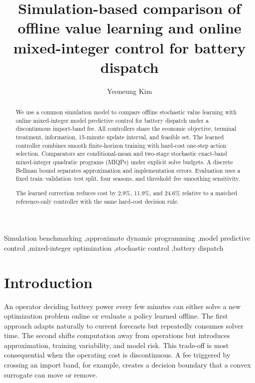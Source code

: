 \documentclass[preprint,11pt]{elsarticle}
\theoremstyle{plain}
\theoremstyle{remark}
\begin{document}
\begin{frontmatter}

\title{Simulation-based comparison of offline value learning and online
mixed-integer control for battery dispatch}

\author[aff1]{Yeoneung Kim}

\begin{abstract}
We use a common simulation model to compare offline stochastic value learning
with online mixed-integer model predictive control for battery dispatch
under a discontinuous import-band fee.
All controllers share the economic objective, terminal treatment, information,
15-minute update interval, and feasible set. The learned controller combines
smooth finite-horizon training with hard-cost one-step action selection.
Comparators are conditional-mean and two-stage stochastic exact-band
mixed-integer quadratic programs (MIQPs) under explicit solve budgets.
A discrete Bellman bound separates approximation and implementation errors.
Evaluation uses a fixed train--validation--test
split, four seasons, and threshold--fee--smoothing sensitivity.

The learned correction reduces cost by 2.9\%, 11.9\%, and 24.6\% relative to a
matched reference-only controller with the same hard-cost decision rule.
\end{abstract}

\begin{keyword}
Simulation benchmarking \sep approximate dynamic programming
\sep model predictive control \sep mixed-integer optimization
\sep stochastic control \sep battery dispatch
\end{keyword}

\end{frontmatter}
\onehalfspacing

\section{Introduction}\label{sec:introduction}

An operator deciding battery power every few minutes can either solve a new
optimization problem online or evaluate a policy learned offline. The first
approach adapts naturally to current forecasts but repeatedly consumes solver
time. The second shifts computation away from operations but introduces
approximation, training variability, and model risk. This trade-off is most
consequential when the operating cost is discontinuous. A fee triggered by
crossing an import band, for example, creates a decision boundary that a convex
surrogate can move or remove.
\end{document}
